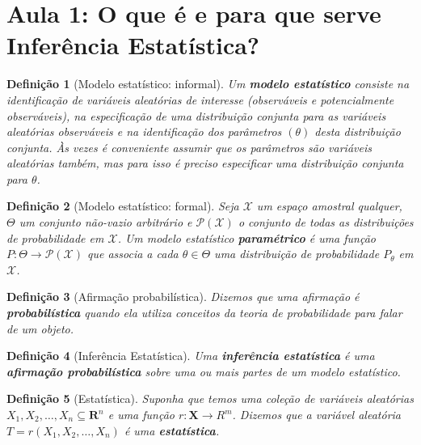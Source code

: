 \documentclass{article}
\newtheorem{definition}{Definição}
\begin{document}
\textbf{}
\vspace{4.5mm}

\textbf{}
\vspace{4.5mm}

\textbf{}

\newpage

\section*{Aula 1: O que é e para que serve Inferência Estatística?}
\label{s1}

\begin{definition}[Modelo estatístico: informal]
Um \textbf{modelo estatístico} consiste na identificação de variáveis aleatórias de interesse (observáveis e potencialmente observáveis), na especificação de uma distribuição conjunta para as variáveis aleatórias observáveis e na identificação dos parâmetros $(\theta)$ desta distribuição conjunta. Às vezes é conveniente assumir que os parâmetros são variáveis aleatórias também, mas para isso é preciso especificar uma distribuição conjunta para $\theta$.
\end{definition}

\begin{definition}[Modelo estatístico: formal]
Seja $\mathcal{X}$ um espaço amostral qualquer, $\Theta$ um conjunto não-vazio arbitrário e $\mathcal{P(X)}$ o conjunto de todas as distribuições de probabilidade em $\mathcal{X}$. Um modelo estatístico \textbf{paramétrico} é uma função $P: \Theta \rightarrow \mathcal{P(X)}$ que associa a cada $\theta \in \Theta$ uma distribuição de probabilidade $P_\theta$ em $\mathcal{X}$.
\end{definition}

\begin{definition}[Afirmação probabilística]
Dizemos que uma afirmação é \textbf{probabilística} quando ela utiliza conceitos da teoria de probabilidade para falar de um objeto.
\end{definition}

\begin{definition}[Inferência Estatística]
Uma \textbf{inferência estatística} é uma \textbf{afirmação probabilística} sobre uma ou mais partes de um modelo estatístico.
\end{definition}

\begin{definition}[Estatística]
Suponha que temos uma coleção de variáveis aleatórias $X_1, X_2, \ldots, X_n \subseteq \mathbf{R}^n$ e uma função $r: \mathbf{X} \rightarrow R^m$. Dizemos que a variável aleatória $T = r(X_1, X_2, \ldots, X_n)$ é uma \textbf{estatística}.
\end{definition}
\end{document}
